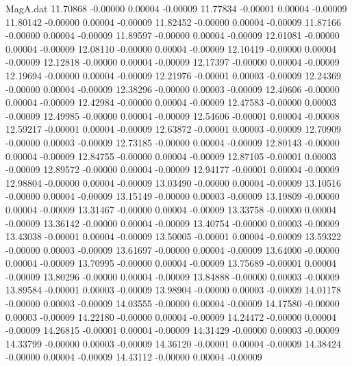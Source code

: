 \begin{filecontents}{MagA.dat}
  11.70868   -0.00000    0.00004   -0.00009
  11.77834   -0.00001    0.00004   -0.00009
  11.80142   -0.00000    0.00004   -0.00009
  11.82452   -0.00000    0.00004   -0.00009
  11.87166   -0.00000    0.00004   -0.00009
  11.89597   -0.00000    0.00004   -0.00009
  12.01081   -0.00000    0.00004   -0.00009
  12.08110   -0.00000    0.00004   -0.00009
  12.10419   -0.00000    0.00004   -0.00009
  12.12818   -0.00000    0.00004   -0.00009
  12.17397   -0.00000    0.00004   -0.00009
  12.19694   -0.00000    0.00004   -0.00009
  12.21976   -0.00001    0.00003   -0.00009
  12.24369   -0.00000    0.00004   -0.00009
  12.38296   -0.00000    0.00003   -0.00009
  12.40606   -0.00000    0.00004   -0.00009
  12.42984   -0.00000    0.00004   -0.00009
  12.47583   -0.00000    0.00003   -0.00009
  12.49985   -0.00000    0.00004   -0.00009
  12.54606   -0.00001    0.00004   -0.00008
  12.59217   -0.00001    0.00004   -0.00009
  12.63872   -0.00001    0.00003   -0.00009
  12.70909   -0.00000    0.00003   -0.00009
  12.73185   -0.00000    0.00004   -0.00009
  12.80143   -0.00000    0.00004   -0.00009
  12.84755   -0.00000    0.00004   -0.00009
  12.87105   -0.00001    0.00003   -0.00009
  12.89572   -0.00000    0.00004   -0.00009
  12.94177   -0.00001    0.00004   -0.00009
  12.98804   -0.00000    0.00004   -0.00009
  13.03490   -0.00000    0.00004   -0.00009
  13.10516   -0.00000    0.00004   -0.00009
  13.15149   -0.00000    0.00003   -0.00009
  13.19809   -0.00000    0.00004   -0.00009
  13.31467   -0.00000    0.00004   -0.00009
  13.33758   -0.00000    0.00004   -0.00009
  13.36142   -0.00000    0.00004   -0.00009
  13.40754   -0.00000    0.00003   -0.00009
  13.43038   -0.00001    0.00004   -0.00009
  13.50005   -0.00001    0.00004   -0.00009
  13.59322   -0.00000    0.00003   -0.00009
  13.61697   -0.00000    0.00004   -0.00009
  13.64000   -0.00000    0.00004   -0.00009
  13.70995   -0.00000    0.00004   -0.00009
  13.75689   -0.00001    0.00004   -0.00009
  13.80296   -0.00000    0.00004   -0.00009
  13.84888   -0.00000    0.00003   -0.00009
  13.89584   -0.00001    0.00003   -0.00009
  13.98904   -0.00000    0.00003   -0.00009
  14.01178   -0.00000    0.00003   -0.00009
  14.03555   -0.00000    0.00004   -0.00009
  14.17580   -0.00000    0.00003   -0.00009
  14.22180   -0.00000    0.00004   -0.00009
  14.24472   -0.00000    0.00004   -0.00009
  14.26815   -0.00001    0.00004   -0.00009
  14.31429   -0.00000    0.00003   -0.00009
  14.33799   -0.00000    0.00003   -0.00009
  14.36120   -0.00001    0.00004   -0.00009
  14.38424   -0.00000    0.00004   -0.00009
  14.43112   -0.00000    0.00004   -0.00009

\end{filecontents}
